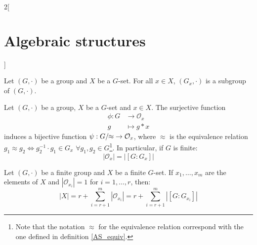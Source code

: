\documentclass[../../../main.tex]{subfiles}
\begin{document}
\begin{multicols}{2}[\section{Algebraic structures}]
\begin{definition}
    \end{definition}
    \begin{prop}
        Let $(G,\cdot)$ be a group and $X$ be a $G$-set. For all $x\in X$, $(G_x,\cdot)$ is a subgroup of $(G,\cdot)$.
    \end{prop}
    \begin{theorem}
        Let $(G,\cdot)$ be a group, $X$ be a $G$-set and $x\in X$. The surjective function
        \begin{align*}
            \phi:G & \longrightarrow \mathcal{O}_x \\
            g      & \longmapsto g*x
        \end{align*}
        induces a bijective function $\psi:\quot{G}{\!\!\approx}\;\rightarrow\mathcal{O}_x$, where $\approx$ is the equivalence relation $g_1\approx g_2\iff g_2^{-1}\cdot g_1\in G_x$ $\forall g_1,g_2\in G$\footnote{Note that the notation $\approx$ for the equivalence relation correspond with the one defined in definition \ref{AS_equiv}.}. In particular, if $G$ is finite: $$|\mathcal{O}_x|=|[G:G_x]|$$
    \end{theorem}
    \begin{corollary}
        Let $(G,\cdot)$ be a finite group and $X$ be a finite $G$-set. If $x_1,\ldots,x_m$ are the elements of $X$ and $|\mathcal{O}_{x_i}|=1$ for $i=1,\ldots,r$, then:
        \begin{equation}
            |X|=r+\sum_{i=r+1}^m|\mathcal{O}_{x_i}|=r+\sum_{i=r+1}^m|[G:G_{x_i}]|
            \label{AS-obritsformula}
        \end{equation}
    \end{corollary}

\end{multicols}
\end{document}
